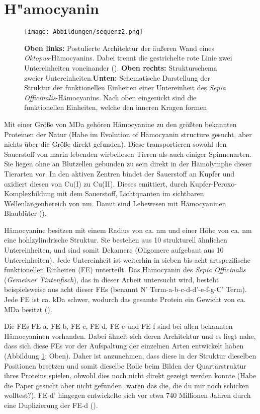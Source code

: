 \section{H"amocyanin}
\label{haemo}

\begin{figure}
	\texttt{[image: Abbildungen/sequenz2.png]}
	\caption[Schematische Darstellung eines Hämocyanins]{\textbf{Oben links:} Postulierte Architektur der äußeren Wand eines \textit{Oktopus}-Hämocyanins. Dabei trennt die gestrichelte rote Linie zwei Untereinheiten voneinander (\cite{julian_haemo}). \textbf{Oben rechts:} Strukturschema zweier Untereinheiten.\textbf{Unten:} Schematische Darstellung der Struktur der funktionellen Einheiten einer Untereinheit des \textit{Sepia Officinalis}-Hämocyanins. Nach oben eingerückt sind die funktionellen Einheiten, welche den inneren Kragen formen}
	\label{seq}
\end{figure}

Mit einer Größe von \unit[3-8]{MDa} gehören Hämocyanine zu den größten bekannten Proteinen der Natur (Habe im Evolution of Hämocyanin structure gesucht, aber nichts über die Größe direkt gefunden).
Diese transportieren sowohl den Sauerstoff von marin lebenden wirbellosen Tieren als auch einiger Spinnenarten.
Sie liegen ohne an Blutzellen gebunden zu sein direkt in der Hämolymphe dieser Tierarten vor.
In den aktiven Zentren bindet der Sauerstoff an Kupfer und oxidiert diesen von Cu(I) zu Cu(II).
Dieses emittiert, durch Kupfer-Peroxo-Komplexbildung mit dem Sauerstoff, Lichtquanten im sichtbaren Wellenlängenbereich von \unit[480-420]{nm}.
Damit sind Lebewesen mit Hämocyaninen Blaublüter (\cite{komplex}).

Hämocyanine besitzen mit einem Radius von ca. \unit[35]{nm} und einer Höhe von ca. \unit[15]{nm} eine hohlzylindrische Struktur.
Sie bestehen aus 10 strukturell ähnlichen Untereinheiten, und sind somit Dekamere (Oligomere aufgebaut aus 10 Untereinheiten). 
Jede Untereinheit ist weiterhin in sieben bis acht artspezifische funktionellen Einheiten (FE) unterteilt.
Das Hämocyanin des \textit{Sepia Officinalis} (\textit{Gemeiner Tintenfisch}), das in dieser Arbeit untersucht wird, besteht beispielsweise aus acht dieser FEs (benannt N' Term-a-b-c-d-d'-e-f-g-C' Term).
Jede FE ist ca. \unit[50]{kDa} schwer, wodurch das gesamte Protein ein Gewicht von ca. \unit[4]{MDa} besitzt (\cite{sepia_3D}).

Die FEs FE-a, FE-b, FE-c, FE-d, FE-e und FE-f sind bei allen bekannten Hämocyaninen vorhanden.
Dabei ähnelt sich deren Architektur und es liegt nahe, dass sich diese FEs vor der Aufspaltung der einzelnen Arten entwickelt haben (Abbildung \ref{seq}: Oben).
Daher ist anzunehmen, dass diese in der Struktur dieselben Positionen besetzen und somit dieselbe Rolle beim Bilden der Quartärstruktur ihres Proteins spielen, obwohl dies noch nicht direkt gezeigt werden konnte (Habe die Paper gesucht aber nicht gefunden, waren das die, die du mir noch schicken wolltest?).
FE-d' hingegen entwickelte sich vor etwa 740 Millionen Jahren durch eine Duplizierung der FE-d (\cite{christos_diss}).

